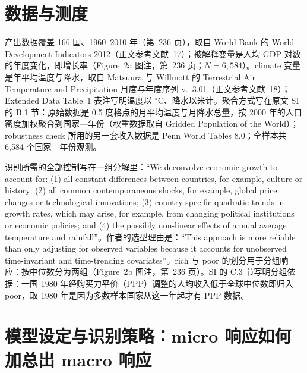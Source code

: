 \section{数据与测度}

产出数据覆盖 166 国、1960--2010 年（第~236 页），取自 World Bank 的 World Development Indicators 2012（正文参考文献~17）；被解释变量是人均 GDP 对数的年度变化，即增长率（Figure~2a 图注，第~236 页；$N=6{,}584$）。climate 变量是年平均温度与降水，取自 Matsuura 与 Willmott 的 Terrestrial Air Temperature and Precipitation 月度与年度序列 v.~3.01（正文参考文献~18）；Extended Data Table~1 表注写明温度以 $^\circ$C、降水以米计。聚合方式写在原文 SI 的 B.1 节：原始数据是 0.5 度格点的月平均温度与月降水总量，按 2000 年的人口密度加权聚合到国家—年份（权重数据取自 Gridded Population of the World）；robustness check 所用的另一套收入数据是 Penn World Tables 8.0；全样本共 6{,}584 个国家—年份观测。

识别所需的全部控制写在一组分解里：``We deconvolve economic growth to account for: (1) all constant differences between countries, for example, culture or history; (2) all common contemporaneous shocks, for example, global price changes or technological innovations; (3) country-specific quadratic trends in growth rates, which may arise, for example, from changing political institutions or economic policies; and (4) the possibly non-linear effects of annual average temperature and rainfall''\citep[第~236 页]{burke2015global}。作者的选型理由是：``This approach is more reliable than only adjusting for observed variables because it accounts for unobserved time-invariant and time-trending covariates''\citep[第~236 页]{burke2015global}。rich 与 poor 的划分用于分组响应：按中位数分为两组（Figure~2b 图注，第~236 页）。SI 的 C.3 节写明分组依据：一国 1980 年经购买力平价（PPP）调整的人均收入低于全球中位数即归入 poor，取 1980 年是因为多数样本国家从这一年起才有 PPP 数据。

\section{模型设定与识别策略：micro 响应如何加总出 macro 响应}


